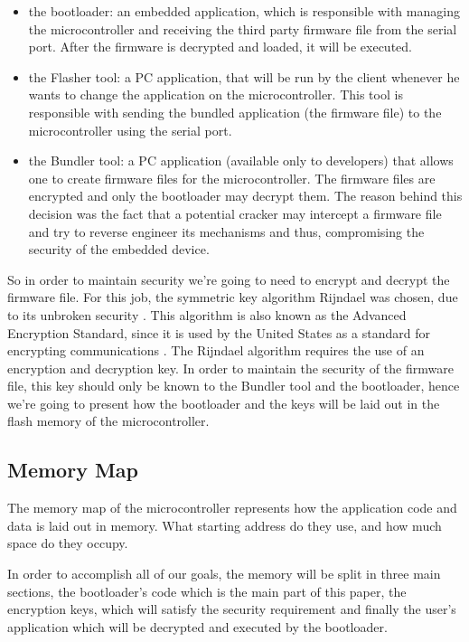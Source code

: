 \documentclass[10pt,a4paper,twoside]{article}
\begin{document}
\begin{itemize}
\item the bootloader: an embedded application, which is responsible with managing the microcontroller and receiving the third party firmware file from the serial port. After the firmware is decrypted and loaded, it will be executed.
\item the Flasher tool: a PC application, that will be run by the client whenever he wants to change the application on the microcontroller. This tool is responsible with sending the bundled application (the firmware file) to the microcontroller using the serial port.
\item the Bundler tool: a PC application (available only to developers) that allows one to create firmware files for the microcontroller. The firmware files are encrypted and only the bootloader may decrypt them. The reason behind this decision was the fact that a potential cracker may intercept a firmware file and try to reverse engineer its mechanisms and thus, compromising the security of the embedded device.
\end{itemize}

So in order to maintain security we're going to need to encrypt and decrypt the firmware file. For this job, the symmetric key algorithm Rijndael was chosen, due to its unbroken security \cite{AES}. This algorithm is also known as the Advanced Encryption Standard, since it is used by the United States as a standard for encrypting communications \cite{wikiAES}.
The Rijndael algorithm requires the use of an encryption and decryption key. In order to maintain the security of the firmware file, this key should only be known to the Bundler tool and the bootloader, hence we're going to present how the bootloader and the keys will be laid out in the flash memory of the microcontroller.

\subsection{Memory Map}
The memory map of the microcontroller represents how the application code and data is laid out in memory. What starting address do they use, and how much space do they occupy.

In order to accomplish all of our goals, the memory will be split in three main sections, the bootloader's code which is the main part of this paper, the encryption keys, which will satisfy the security requirement and finally the user's application which will be decrypted and executed by the bootloader.
\end{document}
